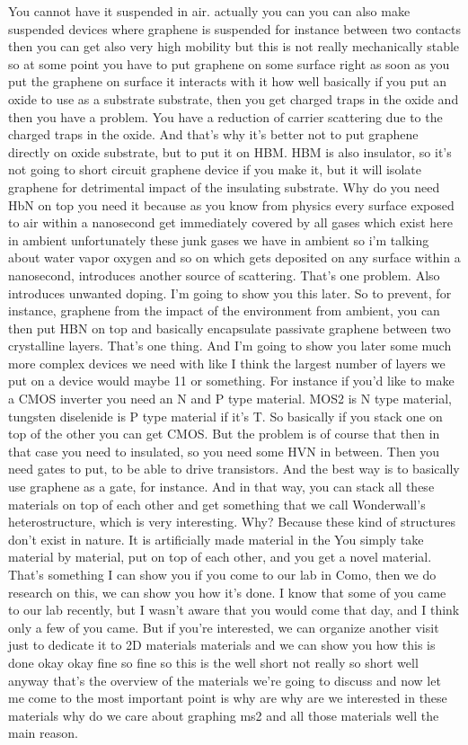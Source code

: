 You cannot have it suspended in air. actually you can you can also make suspended devices where graphene is suspended for instance between two contacts then you can get also very high mobility but this is not really mechanically stable so at some point you have to put graphene on some surface right as soon as you put the graphene on surface it interacts with it how well basically if you put an oxide to use as a substrate substrate, then you get charged traps in the oxide and then you have a problem. You have a reduction of carrier scattering due to the charged traps in the oxide. And that's why it's better not to put graphene directly on oxide substrate, but to put it on HBM. HBM is also insulator, so it's not going to short circuit graphene device if you make it, but it will isolate graphene for detrimental impact of the insulating substrate. Why do you need HbN on top you need it because as you know from physics every surface exposed to air within a nanosecond get immediately covered by all gases which exist here in ambient unfortunately these junk gases we have in ambient so i'm talking about water vapor oxygen and so on which gets deposited on any surface within a nanosecond, introduces another source of scattering. That's one problem. Also introduces unwanted doping. I'm going to show you this later. So to prevent, for instance, graphene from the impact of the environment from ambient, you can then put HBN on top and basically encapsulate passivate graphene between two crystalline layers. That's one thing. And I'm going to show you later some much more complex devices we need with like I think the largest number of layers we put on a device would maybe 11 or something. For instance if you'd like to make a CMOS inverter you need an N and P type material. MOS2 is N type material, tungsten diselenide is P type material if it's T. So basically if you stack one on top of the other you can get CMOS. But the problem is of course that then in that case you need to insulated, so you need some HVN in between. Then you need gates to put, to be able to drive transistors. And the best way is to basically use graphene as a gate, for instance. And in that way, you can stack all these materials on top of each other and get something that we call Wonderwall's heterostructure, which is very interesting. Why? Because these kind of structures don't exist in nature. It is artificially made material in the You simply take material by material, put on top of each other, and you get a novel material. That's something I can show you if you come to our lab in Como, then we do research on this, we can show you how it's done. I know that some of you came to our lab recently, but I wasn't aware that you would come that day, and I think only a few of you came. But if you're interested, we can organize another visit just to dedicate it to 2D materials materials and we can show you how this is done okay okay fine so fine so this is the well short not really so short well anyway that's the overview of the materials we're going to discuss and now let me come to the most important point is why are why are we interested in these materials why do we care about graphing ms2 and all those materials well the main reason.\\
